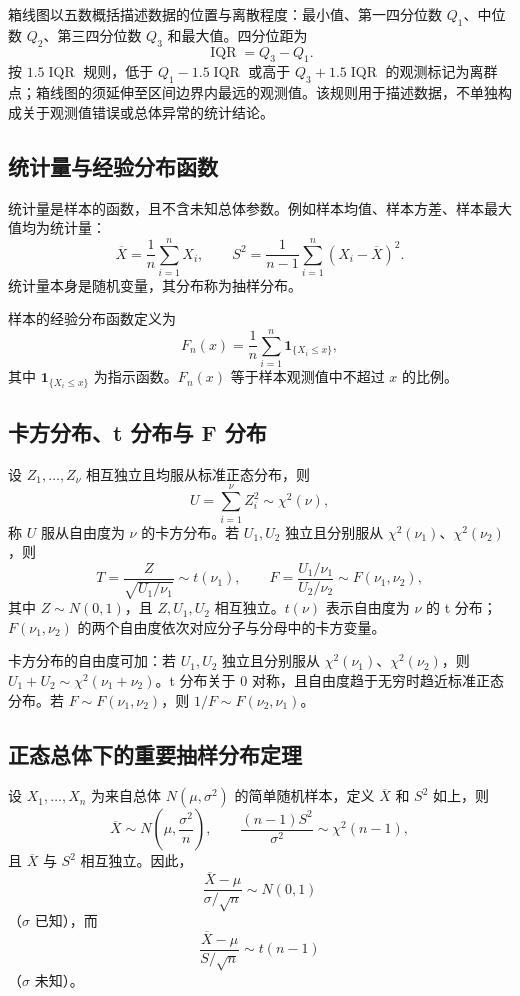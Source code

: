 \documentclass[11pt,a4paper,fontset=fandol]{ctexart}
\theoremstyle{remark}
\begin{document}
箱线图以五数概括描述数据的位置与离散程度：最小值、第一四分位数 $Q_1$、中位数 $Q_2$、第三四分位数 $Q_3$ 和最大值。四分位距为
\[
    \operatorname{IQR}=Q_3-Q_1.
\]
按 $1.5\operatorname{IQR}$ 规则，低于 $Q_1-1.5\operatorname{IQR}$ 或高于 $Q_3+1.5\operatorname{IQR}$ 的观测标记为离群点；箱线图的须延伸至区间边界内最远的观测值。该规则用于描述数据，不单独构成关于观测值错误或总体异常的统计结论。

\subsection{统计量与经验分布函数}
统计量是样本的函数，且不含未知总体参数。例如样本均值、样本方差、样本最大值均为统计量：
\[
    \overline X=\frac1n\sum_{i=1}^{n}X_i,\qquad
    S^2=\frac1{n-1}\sum_{i=1}^{n}(X_i-\overline X)^2.
\]
统计量本身是随机变量，其分布称为抽样分布。

样本的经验分布函数定义为
\[
    F_n(x)=\frac1n\sum_{i=1}^{n}\mathbf{1}_{\{X_i\leq x\}},
\]
其中 $\mathbf{1}_{\{X_i\leq x\}}$ 为指示函数。$F_n(x)$ 等于样本观测值中不超过 $x$ 的比例。

\subsection{卡方分布、t 分布与 F 分布}
设 $Z_1,\ldots,Z_\nu$ 相互独立且均服从标准正态分布，则
\[
    U=\sum_{i=1}^{\nu}Z_i^2\sim\chi^2(\nu),
\]
称 $U$ 服从自由度为 $\nu$ 的卡方分布。若 $U_1,U_2$ 独立且分别服从 $\chi^2(\nu_1)$、$\chi^2(\nu_2)$，则
\[
    T=\frac{Z}{\sqrt{U_1/\nu_1}}\sim t(\nu_1),
    \qquad
    F=\frac{U_1/\nu_1}{U_2/\nu_2}\sim F(\nu_1,\nu_2),
\]
其中 $Z\sim N(0,1)$，且 $Z,U_1,U_2$ 相互独立。$t(\nu)$ 表示自由度为 $\nu$ 的 t 分布；$F(\nu_1,\nu_2)$ 的两个自由度依次对应分子与分母中的卡方变量。

卡方分布的自由度可加：若 $U_1,U_2$ 独立且分别服从 $\chi^2(\nu_1)$、$\chi^2(\nu_2)$，则 $U_1+U_2\sim\chi^2(\nu_1+\nu_2)$。t 分布关于 $0$ 对称，且自由度趋于无穷时趋近标准正态分布。若 $F\sim F(\nu_1,\nu_2)$，则 $1/F\sim F(\nu_2,\nu_1)$。

\subsection{正态总体下的重要抽样分布定理}
设 $X_1,\ldots,X_n$ 为来自总体 $N(\mu,\sigma^2)$ 的简单随机样本，定义 $\overline X$ 和 $S^2$ 如上，则
\[
    \overline X\sim N\left(\mu,\frac{\sigma^2}{n}\right),\qquad
    \frac{(n-1)S^2}{\sigma^2}\sim\chi^2(n-1),
\]
且 $\overline X$ 与 $S^2$ 相互独立。因此，
\[
    \frac{\overline X-\mu}{\sigma/\sqrt n}\sim N(0,1)
\]
（$\sigma$ 已知），而
\[
    \frac{\overline X-\mu}{S/\sqrt n}\sim t(n-1)
\]
（$\sigma$ 未知）。
\end{document}

